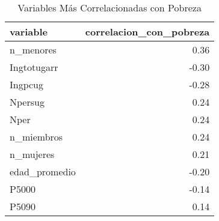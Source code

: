 \begin{table}[ht]
\centering
\begin{tabular}{lr}
  \toprule
variable & correlacion\_con\_pobreza \\ 
  \midrule
n\_menores & 0.36 \\ 
  Ingtotugarr & -0.30 \\ 
  Ingpcug & -0.28 \\ 
  Npersug & 0.24 \\ 
  Nper & 0.24 \\ 
  n\_miembros & 0.24 \\ 
  n\_mujeres & 0.21 \\ 
  edad\_promedio & -0.20 \\ 
  P5000 & -0.14 \\ 
  P5090 & 0.14 \\ 
   \bottomrule
\end{tabular}
\caption{Variables Más Correlacionadas con Pobreza} 
\label{tab:variables_importantes}
\end{table}
